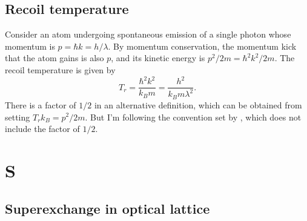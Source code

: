 \documentclass{book}
\theoremstyle{definition}
\newcommand{\f}[2]{\frac{#1}{#2}}
\begin{document}
\section*{Recoil temperature}

Consider an atom undergoing spontaneous emission of a single photon whose momentum is $p = \hbar k = h/\lambda$. By momentum conservation, the momentum kick that the atom gains is also $p$, and its kinetic energy is $p^2/2m = \hbar^2k^2/2m$. The recoil temperature is given by 
\begin{equation*}
T_r = \f{\hbar^2k^2}{k_Bm} = \f{h^2}{k_B m \lambda^2}.
\end{equation*} 
There is a factor of $1/2$ in an alternative definition, which can be obtained from setting $T_r k_B = p^2/2m$. But I'm following the convention set by \cite{metcalf2007laser}, which does not include the factor of $1/2$.



\chapter*{S}














\section*{Superexchange in optical lattice}
\end{document}

